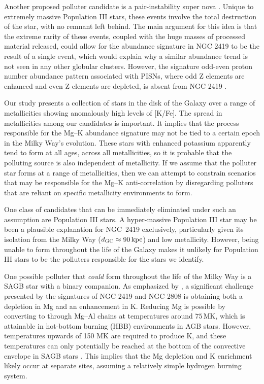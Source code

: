 \documentclass[a4paper,fleqn,usenatbib]{mnras}
\begin{document}
Another proposed  polluter candidate is a pair-instability super nova \citep[PISN;][]{carretta2013}. Unique to extremely massive Population III stars, these events involve the total destruction of the star, with no remnant left behind. The main argument for this idea is that the extreme rarity of these events, coupled with the huge masses of processed material released, could allow for the abundance signature in NGC 2419 to be the result of a single event, which would explain why a similar abundance trend is not seen in any other globular clusters. However, the signature odd-even proton number abundance pattern associated with PISNs, where odd Z elements are enhanced and even Z elements are depleted, is absent from NGC 2419 \citep{carretta2013, cohenkirby2012}.

Our study presents a collection of stars in the disk of the Galaxy over a range of metallicities showing anomalously high levels of [K/Fe]. The spread in metallicities among our candidates is important. It implies that the process responsible for the Mg--K abundance signature may not be tied to a certain epoch in the Milky Way's evolution. These stars with enhanced potassium apparently tend to form at all ages, across all metallicities, so it is probable that the polluting source is also independent of metallicity. If we assume that the polluter star forms at a range of metallicities, then we can attempt to constrain scenarios that may be responsible for the Mg--K anti-correlation by disregarding polluters that are reliant on specific metallicity environments to form.

One class of candidates that can be immediately eliminated under such an assumption are Population III stars. A hyper-massive Population III star may be been a plausible explanation for NGC~2419 \citep{carretta2013} exclusively, particularly given its isolation from the Milky Way ($d_{\rm GC} \approx 90\,{\rm kpc}$) and low metallicity. However, being unable to form throughout the life of the Galaxy makes it unlikely for Population III stars to be the polluters responsible for the stars we identify.

One possible polluter that \textit{could} form throughout the life of the Milky Way is a SAGB star with a binary companion. As emphasized by \cite{prantzos2017}, a significant challenge presented by the signatures of NGC 2419 and NGC 2808 is obtaining both a depletion in Mg and an enhancement in K. Reducing Mg is possible by converting  to  through Mg--Al chains at temperatures around $75\,$MK, which is attainable in hot-bottom burning (HBB) environments in AGB stars. However, temperatures upwards of 150 MK are required to produce K, and these temperatures can only potentially be reached at the bottom of the convective envelope in SAGB stars \citep{iliadis2016}. This implies that the Mg depletion and K enrichment likely occur at separate sites, assuming a relatively simple hydrogen burning system. 
\end{document}
